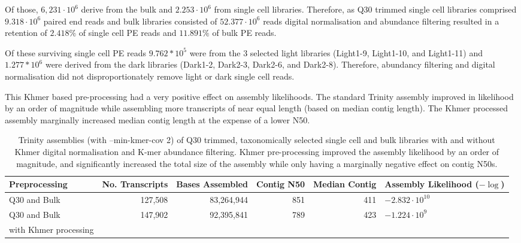 Of those, \(6,231\cdot 10^{6}\) derive from the bulk and \(2.253\cdot 10^6\) 
from single cell libraries. 
Therefore, as Q30 trimmed single cell libraries comprised
\(9.318\cdot 10^{6}\) paired end reads and bulk libraries 
consisted of \(52.377\cdot 10^6\) reads digital normalisation
and abundance filtering resulted in a retention of 
\(2.418\%\) of single cell PE reads and \(11.891\%\) of
bulk PE reads.

Of these surviving single cell PE reads \(9.762*10^{5}\) 
were from the 3 selected light libraries (Light1-9, Light1-10, and Light1-11) 
and \(1.277*10^{6}\) were derived from the dark libraries (Dark1-2, Dark2-3,
Dark2-6, and Dark2-8).  Therefore, abundancy filtering and digital normalisation
did not disproportionately remove light or dark single cell reads.

This Khmer based pre-processing had a very positive effect on 
assembly likelihoods.  The standard Trinity assembly improved in
likelihood by an order of magnitude 
while assembling more transcripts of near equal length (based on
median contig length).  The Khmer processed assembly marginally increased
median contig length at the expense of a lower N50. 

\begin{table}[h]
     \begin{tabularx}{\textwidth}{|l||r|r|r|r|X|}
     	\hline
         \textbf{Preprocessing} & \textbf{No. Transcripts} & \textbf{Bases Assembled} & \textbf{Contig N50} & \textbf{Median Contig} & \textbf{Assembly Likelihood (\(-\log\))} \\
         \hline
         Q30 and Bulk &  127,508 & 83,264,944 & 851 & 411 & \(-2.832 \cdot 10^{10}\) \\
         \hline
         Q30 and Bulk  & 147,902 & 92,395,841 & 789 & 423 & \(-1.224 \cdot 10^{9}\) \\  
    with Khmer processing & 	 & 			 &      & 	  & 	\\
    \hline
    \end{tabularx}
    \caption{Trinity assemblies (with --min-kmer-cov 2) 
        of Q30 trimmed, taxonomically selected single cell and bulk libraries 
    with and without Khmer digital normalisation and K-mer abundance filtering.
    Khmer pre-processing improved the assembly likelihood by an order of magnitude,
    and significantly increased the total size of the assembly while only having
    a marginally negative effect on contig N50s. 
    }
    \label{tab:diginorm_assembly}
\end{table}

